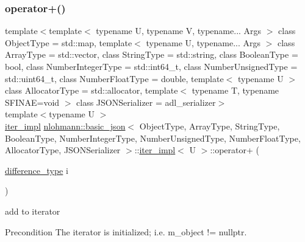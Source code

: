 \subsubsection{\texorpdfstring{operator+()}{operator+()}}
{\footnotesize\ttfamily template$<$template$<$ typename U, typename V, typename... Args $>$ class Object\+Type = std\+::map, template$<$ typename U, typename... Args $>$ class Array\+Type = std\+::vector, class String\+Type  = std\+::string, class Boolean\+Type  = bool, class Number\+Integer\+Type  = std\+::int64\+\_\+t, class Number\+Unsigned\+Type  = std\+::uint64\+\_\+t, class Number\+Float\+Type  = double, template$<$ typename U $>$ class Allocator\+Type = std\+::allocator, template$<$ typename T, typename S\+F\+I\+N\+A\+E=void $>$ class J\+S\+O\+N\+Serializer = adl\+\_\+serializer$>$ \\
template$<$typename U $>$ \\
\hyperlink{classnlohmann_1_1basic__json_1_1iter__impl}{iter\+\_\+impl} \hyperlink{classnlohmann_1_1basic__json}{nlohmann\+::basic\+\_\+json}$<$ Object\+Type, Array\+Type, String\+Type, Boolean\+Type, Number\+Integer\+Type, Number\+Unsigned\+Type, Number\+Float\+Type, Allocator\+Type, J\+S\+O\+N\+Serializer $>$\+::\hyperlink{classnlohmann_1_1basic__json_1_1iter__impl}{iter\+\_\+impl}$<$ U $>$\+::operator+ (\begin{DoxyParamCaption}\item[{\hyperlink{classnlohmann_1_1basic__json_1_1iter__impl_aa3d908ee643e5938d32e5f6d261d7715}{difference\+\_\+type}}]{i }\end{DoxyParamCaption})\hspace{0.3cm}{\ttfamily [inline]}}



add to iterator 

\begin{DoxyPrecond}{Precondition}
The iterator is initialized; i.\+e. {\ttfamily m\+\_\+object != nullptr}. 
\end{DoxyPrecond}
\mbox{\label{classnlohmann_1_1basic__json_1_1iter__impl_a74e26f187519bc7181b825b8f38a4e93}} 
